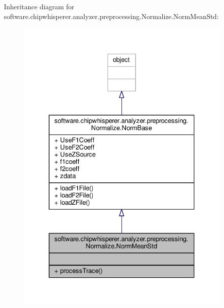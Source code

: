 Inheritance diagram for software.\+chipwhisperer.\+analyzer.\+preprocessing.\+Normalize.\+Norm\+Mean\+Std\+:\nopagebreak
\begin{figure}[H]
\begin{center}
\leavevmode
\includegraphics[width=304pt]{d0/d30/classsoftware_1_1chipwhisperer_1_1analyzer_1_1preprocessing_1_1Normalize_1_1NormMeanStd__inherit__graph}
\end{center}
\end{figure}


